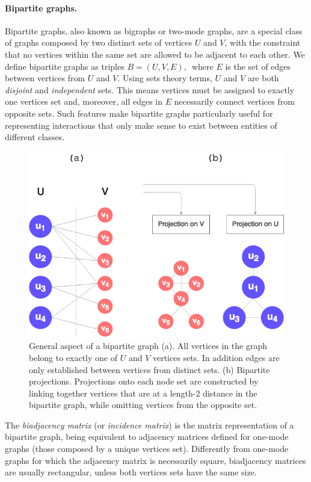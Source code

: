 \paragraph*{Bipartite graphs.}
Bipartite graphs, also known as bigraphs or two-mode graphs, are a special class of graphs composed by two distinct sets of vertices $U$ and $V$, with the constraint that no vertices within the same set are allowed to be adjacent to each other. 
We define bipartite graphs as triples 
$
B = (U, V, E) \mbox{, }
$
where $E$ is the set of edges between vertices from $U$ and $V$.
Using sets theory terms, $U$ and $V$ are both \textit{disjoint} and \textit{independent} sets.
This means vertices must be assigned to exactly one vertices set and, moreover, all edges in $E$ necessarily connect vertices from opposite sets. 
Such features make bipartite graphs particularly useful for representing interactions that only make sense to exist between entities of different classes. 

  \begin{figure}[h!]
  	\centering
    \includegraphics[width=0.5\linewidth]{figures/bipartite_general.png}
    \caption{General aspect of a bipartite graph (a). All vertices in the graph belong to exactly one of $U$ and $V$ vertices sets. In addition edges are only established between vertices from distinct sets. (b) Bipartite projections. Projections onto each node set are constructed by linking together vertices that are at a length-2 distance in the bipartite graph, while omitting vertices from the opposite set.}
    \label{fig:bipartite_general}
  \end{figure}

The \textit{biadjacency matrix} (or \textit{incidence matrix}) is the matrix representation of a bipartite graph, being equivalent to adjacency matrices defined for one-mode graphs (those composed by a unique vertices set). 
Differently from one-mode graphs for which the adjacency matrix is necessarily square, biadjacency matrices are usually rectangular, unless both vertices sets have the same size.

